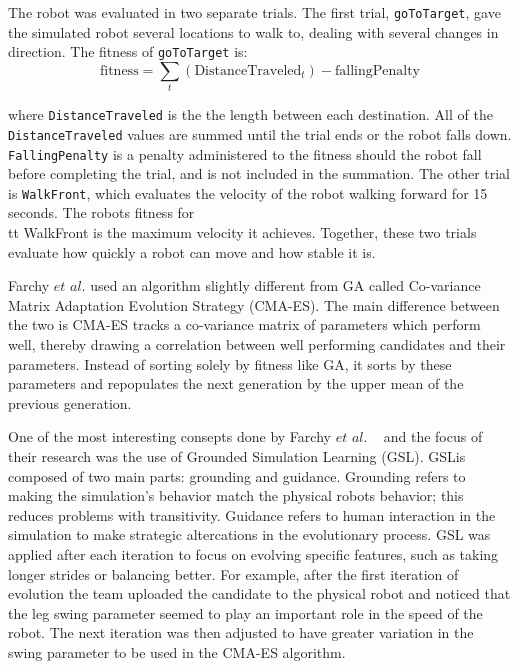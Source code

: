 \documentclass{sig-alternate}
\begin{document}
 The robot was evaluated in two separate trials. The first trial, {\tt goToTarget}, gave the simulated robot several locations to walk to, dealing with several changes in direction. The fitness of {\tt goToTarget} is:
\[
  \textrm{fitness} = \sum_{t} (\textrm{DistanceTraveled}_t) - \textrm{fallingPenalty}
\] 

 where {\tt DistanceTraveled} is the the length between each destination. All of the {\tt DistanceTraveled} values are summed until the trial ends or the robot falls down. {\tt FallingPenalty} is a penalty administered to the fitness should the robot fall before completing the trial, and is not included in the summation. The other trial is {\tt WalkFront}, which evaluates the velocity of the robot walking forward for 15 seconds. The robots fitness for {\\tt WalkFront} is the maximum velocity it achieves. Together, these two trials evaluate how quickly a robot can move and how stable it is.
  
  Farchy $et$ $al.$ used an algorithm slightly different from GA called Co-variance Matrix Adaptation Evolution Strategy (CMA-ES). The main difference between the two is CMA-ES tracks a co-variance matrix of parameters which perform well, thereby drawing a correlation between well performing candidates and their parameters. Instead of sorting solely by fitness like GA, it sorts by these parameters and repopulates the next generation by the upper mean of the previous generation.
  
  One of the most interesting consepts done by Farchy $et$ $al.$ ~\cite{Farchy:2013:HRL:2484920.2484930} and the focus of their research was the use of Grounded Simulation Learning (GSL). GSLis composed of two main parts: grounding and guidance. Grounding refers to making the simulation's behavior match the physical robots behavior; this reduces problems with transitivity. Guidance refers to human interaction in the simulation to make strategic altercations in the evolutionary process. GSL was applied after each iteration to focus on evolving specific features, such as taking longer strides or balancing better. For example, after the first iteration of evolution the team uploaded the candidate to the physical robot and noticed that the leg swing parameter seemed to play an important role in the speed of the robot. The next iteration was then adjusted to have greater variation in the swing parameter to be used in the CMA-ES algorithm. 
\end{document}
